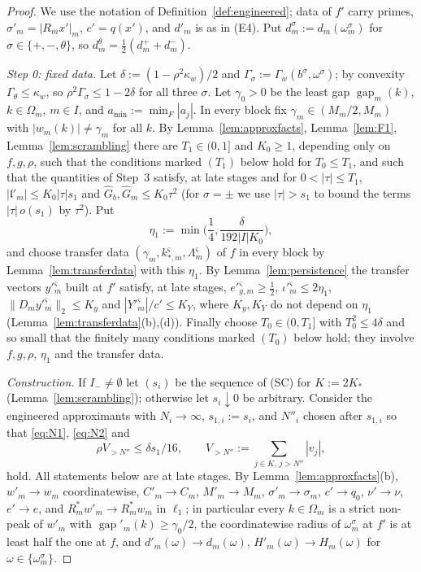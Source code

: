 \documentclass[10pt]{amsart}
\theoremstyle{definition}
\theoremstyle{remark}
\newcommand{\gap}{\operatorname{gap}}
\newcommand{\lin}{\mathfrak l}
\begin{document}
\begin{proof}
We use the notation of Definition~\ref{def:engineered}; data of $f'$ carry
primes, $\sigma'_m=|R_mx'|_m$, $c'=q(x')$, and $d'_m$ is as in (E4).  Put
$d^\sigma_m:=d_m(\omega^\sigma_m)$ for $\sigma\in\{+,-,\theta\}$, so
$d^\theta_m=\frac12(d^+_m+d^-_m)$.

\emph{Step 0: fixed data.}  Let $\delta:=(1-\rho^2\kappa_w)/2$ and
$\Gamma_\sigma:=\Gamma_w(b^\sigma,\omega^\sigma)$; by convexity
$\Gamma_\theta\le\kappa_w$, so $\rho^2\Gamma_\sigma\le1-2\delta$ for all
three $\sigma$.  Let $\gamma_0>0$ be the least gap $\gap_m(k)$, $k\in
\Omega_m$, $m\in I$, and $a_{\min}:=\min_F|a_j|$.  In every block fix
$\gamma_m\in(M_m/2,M_m)$ with $|w_m(k)|\ne\gamma_m$ for all $k$.  By
Lemma~\ref{lem:approxfacts}, Lemma~\ref{lem:F1}, Lemma~\ref{lem:scrambling}
there are $T_1\in(0,1]$ and $K_0\ge1$, depending only on $f,g,\rho$, such
that the conditions marked $(T_1)$ below hold for $T_0\le T_1$, and such
that the quantities of Step~3 satisfy, at late stages and for
$0<|\tau|\le T_1$, $|\lin'_m|\le K_0|\tau|s_1$ and $\hat G_b,\hat G_m\le
K_0\tau^2$ (for $\sigma=\pm$ we use $|\tau|>s_1$ to bound the terms
$|\tau|\,o(s_1)$ by $\tau^2$).  Put
\[
 \eta_1:=\min\Big(\frac14,\frac\delta{192|I|K_0}\Big),
\]
and choose transfer data $(\gamma_m,k^\varsigma_{*,m},\Lambda^\varsigma_m)$ of
$f$ in every block by Lemma~\ref{lem:transferdata} with this $\eta_1$.  By
Lemma~\ref{lem:persistence} the transfer vectors $y'^\varsigma_m$ built at
$f'$ satisfy, at late stages, $e'^\varsigma_{y,m}\ge\frac12$,
$\iota'^\varsigma_m\le2\eta_1$, $\|D_my'^\varsigma_m\|_2\le K_y$ and
$|Y'^\varsigma_m|/c'\le K_Y$, where $K_y,K_Y$ do not depend on $\eta_1$
(Lemma~\ref{lem:transferdata}(b),(d)).  Finally choose $T_0\in(0,T_1]$ with
$T_0^2\le4\delta$ and so small that the finitely many conditions marked
$(T_0)$ below hold; they involve $f,g,\rho$, $\eta_1$ and the transfer
data.

\emph{Construction.}  If $I_-\ne\emptyset$ let $(s_i)$ be the sequence of
\textup{(SC)} for $K:=2K_*$ (Lemma~\ref{lem:scrambling}); otherwise let
$s_i\downarrow0$ be arbitrary.  Consider the engineered approximants with
$N_i\to\infty$, $s_{1,i}:=s_i$, and $N''_i$ chosen after $s_{1,i}$ so that
\eqref{eq:N1}, \eqref{eq:N2} and
\begin{equation}\label{eq:N3}
 \rho V_{>N''}\le\delta s_1/16,\qquad V_{>N''}:=\sum_{j\in K,\,j>N''}|v_j|,
\end{equation}
hold.  All statements below are at late stages.  By
Lemma~\ref{lem:approxfacts}(b), $w'_m\to w_m$ coordinatewise, $C'_m\to C_m$,
$M'_m\to M_m$, $\sigma'_m\to\sigma_m$, $c'\to q_0$, $\nu'\to\nu$, $e'\to e$,
and $R^*_mw'_m\to R_m^*w_m$ in $\ell_1$; in particular every $k\in\Omega_m$
is a strict non-peak of $w'_m$ with $\gap'_m(k)\ge\gamma_0/2$, the
coordinatewise radius of $\omega^\sigma_m$ at $f'$ is at least half the one
at $f$, and $d'_m(\omega)\to d_m(\omega)$, $H'_m(\omega)\to H_m(\omega)$ for
$\omega\in\{\omega^\sigma_m\}$.


\end{proof}
\end{document}
